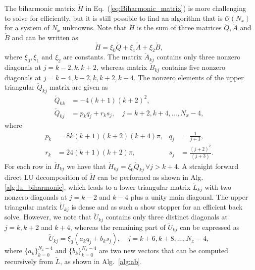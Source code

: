 \documentclass[preprint]{elsarticle}
\newcommand{\N}[1]{\check{#1}}
\begin{document}
The biharmonic matrix $\N{H}$ in Eq.~(\ref{eq:Biharmonic_matrix}) is more 
challenging to solve for efficiently, but 
it is still possible to find an algorithm that is $\mathcal{O}(N_x)$ for a system of $N_x$ 
unknowns. Note 
that $\N{H}$ is the sum of three matrices $\N{Q}, \N{A}$ and $\N{B}$ and can be 
written as
\begin{equation}
\N{H} = \xi_0\N{Q} + \xi_1\N{A} + \xi_2 \N{B},
\end{equation}
where $\xi_0, \xi_1$ and $\xi_2$ are constants. The matrix $\N{A}_{kj}$ contains only 
three nonzero diagonals at $ j = k-2, k, k+2$,  whereas matrix $\N{B}_{kj}$ 
contains five 
nonzero diagonals at $ j = k-4, k-2, k, k+2, k+4$. The nonzero elements of the 
upper triangular $\N{Q}_{kj}$ matrix are given as
\begin{align}
\label{eq:N_Q}
 \N{Q}_{kk} &= -4(k+1)(k+2)^2, \\
 \N{Q}_{kj} &= p_kq_j + r_ks_j, \quad j = k+2, k+4, \ldots, N_x-4,
\end{align}
where 
\begin{align}
p_k &= 8 k (k+1)(k+2)(k+4)\pi, &q_j &= \frac{1}{j+3}, \label{eq:pk} \\
r_k &= 24(k+1)(k+2)\pi, &s_j &=  \frac{(j+2)^2}{(j+3)}. \label{eq:rk}
\end{align} 
For each row in $\N{H}_{kj}$ we have that $\N{H}_{kj}=\xi_0\N{Q}_{kj}\, \forall j 
> k+4$. A straight forward direct LU decomposition of $\N{H}$ can be performed 
as shown in Alg. 
\ref{alg:lu_biharmonic}, which leads to a lower triangular 
matrix $\N{L}_{kj}$ with two nonzero diagonals at $j=k-2$ and $k-4$ plus a 
unity 
main diagonal. The upper triangular matrix $\N{U}_{kj}$ is dense and as such a 
show stopper for an efficient back solve. However, we note that $\N{U}_{kj}$ 
contains only three distinct 
diagonals at $j=k, k+2$ and $k+4$, whereas the remaining part of $\N{U}_{kj}$ 
can be expressed as
\begin{equation}
\N{U}_{kj} = \xi_0(a_k q_j + b_k s_j), \quad j = k+6, k+8, \ldots, N_x-4, 
\label{eq:ab}
\end{equation}
where $\{a_k\}_{k=0}^{N_x-4}$ and $\{b_k\}_{k=0}^{N_x-4}$ are two new 
vectors that can be computed recursively from $\N{L}$, as shown in Alg.~\ref{alg:ab}. 
\end{document}
